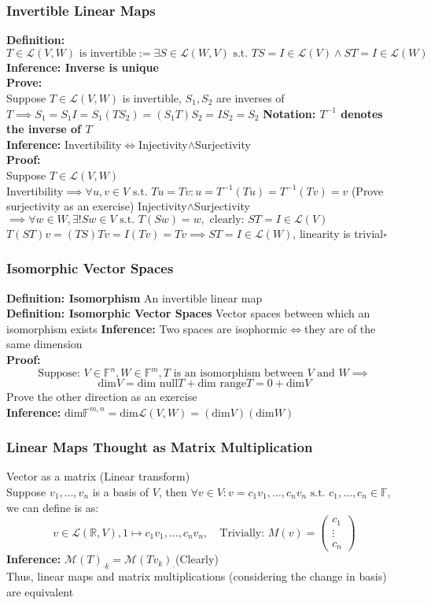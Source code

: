 \documentclass{article}
\newcommand{\R}{\mathbb{R}}
\newcommand{\F}{\mathbb{F}}
\newcommand{\st}{\mbox{ s.t. }}
\newcommand{\clear}{\mbox{ clearly: }}
\newcommand{\0}{{\bf{0}}}
\begin{document}
\subsubsection{Invertible Linear Maps}
\textbf{Definition:}
$$T\in\mathcal{L}(V,W)\mbox{ is invertible}:=\exists S\in\mathcal{L}(W,V)\st TS=I\in\mathcal{L}(V)\land ST=I\in\mathcal{L}(W)$$
\textbf{Inference: Inverse is unique}\\
\textbf{Prove:}\\
Suppose $T\in\mathcal{L}(V,W)$ is invertible, $S_1,S_2$ are inverses of $T\implies S_1=S_1I=S_1(TS_2)=(S_1T)S_2=IS_2=S_2$
\textbf{Notation: $T^{-1}$ denotes the inverse of $T$}\\
\textbf{Inference:} Invertibility$\iff$Injectivity$\land$Surjectivity\\
\textbf{Proof:}\\
Suppose $T\in\mathcal{L}(V,W)$\\
Invertibility$\implies\forall u,v\in V\st Tu=Tv:u=T^{-1}(Tu)=T^{-1}(Tv)=v$ (Prove surjectivity as an exercise)
Injectivity$\land$Surjectivity$\implies\forall w\in W,\exists! Sw\in V\st T(Sw)=w,\clear ST=I\in\mathcal{L}(V)$\\
$T(ST)v=(TS)Tv=I(Tv)=Tv\implies ST=I\in\mathcal{L}(W)$, linearity is trivial\quad$\square$
\subsubsection{Isomorphic Vector Spaces}
\textbf{Definition: Isomorphism} An invertible linear map\\
\textbf{Definition: Isomorphic Vector Spaces} Vector spaces between which an isomorphism exists
\textbf{Inference:} Two spaces are isophormic$\iff$they are of the same dimension\\
\textbf{Proof:}
$$\mbox{Suppose: }V\in\F^n,W\in\F^m,T\mbox{ is an isomorphism between $V$ and $W$}\implies$$
$$\mbox{dim}V=\mbox{dim null}T+\mbox{dim range}T=0+\mbox{dim}V$$
\null\hfill{Prove the other direction as an exercise}\\
\textbf{Inference: }$\mbox{dim}\F^{m,n}=\mbox{dim}\mathcal{L}(V,W)=(\mbox{dim}V)(\mbox{dim}W)$
\subsubsection{Linear Maps Thought as Matrix Multiplication}
Vector as a matrix (Linear transform)\\
Suppose $v_1,\dots,v_n$ is a basis of $V$, then $\forall v\in V:v=c_1v_1,\dots,c_nv_n\st c_1,\dots,c_n\in\F$, we can define is as:
$$v\in\mathcal{L}(\R,V),1\mapsto c_1v_1,\dots,c_nv_n,\quad\mbox{Trivially: }M(v)=\begin{pmatrix}
    c_1\\
    \vdots\\
    c_n
\end{pmatrix}$$
\textbf{Inference: }$\mathcal{M}(T)_{\cdot k}=\mathcal{M}(Tv_k)_\cdot$\quad(Clearly)\\
Thus, linear maps and matrix multiplications (considering the change in basis) are equivalent
\end{document}
